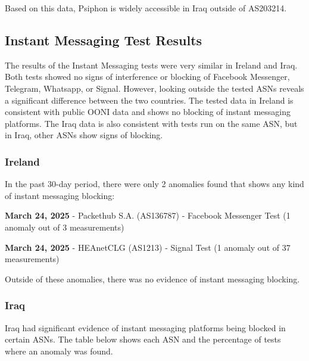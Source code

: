 Based on this data, Psiphon is widely accessible in Iraq outside of AS203214.

\subsection{Instant Messaging Test Results}

The results of the Instant Messaging tests were very similar in Ireland and Iraq. Both tests showed no signs of interference or blocking of Facebook Messenger, Telegram, Whatsapp, or Signal. However, looking outside the tested ASNs reveals a significant difference between the two countries. The tested data in Ireland is consistent with public OONI data and shows no blocking of instant messaging platforms. The Iraq data is also consistent with tests run on the same ASN, but in Iraq, other ASNs show signs of blocking.

\subsubsection{Ireland}

In the past 30-day period, there were only 2 anomalies found that shows any kind of instant messaging blocking:

\textbf{March 24, 2025} - Packethub S.A. (AS136787) - Facebook Messenger Test (1 anomaly out of 3 measurements)

\textbf{March 24, 2025} - HEAnetCLG (AS1213) - Signal Test (1 anomaly out of 37 measurements)

Outside of these anomalies, there was no evidence of instant messaging blocking.

\subsubsection{Iraq}

Iraq had significant evidence of instant messaging platforms being blocked in certain ASNs. The table below shows each ASN and the percentage of tests where an anomaly was found.

\vspace{2em}

